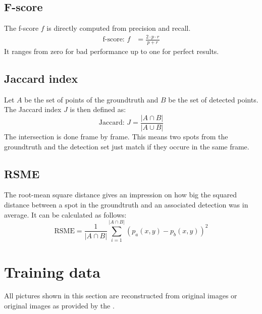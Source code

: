 \subsection{F-score}
The f-score $f$ is directly computed from precision and recall.
\begin{eqnarray}
	\text{f-score: }f &=\frac{2\cdot p \cdot r}{p+r} 
\end{eqnarray}
It ranges from zero for bad performance up to one for perfect results.
\subsection{Jaccard index}
Let $A$ be the set of points of the groundtruth and $B$ be the set of detected points. The Jaccard index $J$ is then defined as:
\begin{equation}
\text{Jaccard: }J = \frac{\left|A\cap B\right|}{\left|A\cup B\right|}
\end{equation}
The intersection is done frame by frame. This means two spots from the groundtruth and the detection set just match if they occure in the same frame. 
\subsection{RSME}
The root-mean square distance gives an impression on how big the squared distance between a spot in the groundtruth and an associated detection was in average. It can be calculated as follows:
\begin{equation}
\text{RSME} = \frac{1}{\left|A\cap B\right|}\sum\limits_{i=1}^{\left|A\cap B\right|} \left(p_a(x,y)-p_b(x,y)\right)^2
\end{equation}
\section{Training data}
All pictures shown in this section are reconstructed from original images or original images as provided by the \cite{challenge}.
